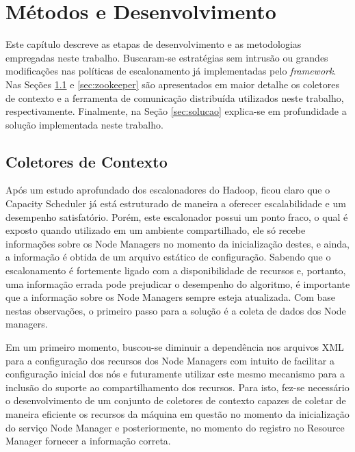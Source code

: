 \chapter{Métodos e Desenvolvimento}
\label{cap:desen}
Este capítulo descreve as etapas de desenvolvimento e as metodologias empregadas neste trabalho. Buscaram-se estratégias sem intrusão ou grandes modificações nas políticas de escalonamento já implementadas pelo \textit{framework}. Nas Seções \ref{sec:collector} e \ref{sec:zookeeper} são apresentados em maior detalhe os coletores de contexto e a ferramenta de comunicação distribuída utilizados neste trabalho, respectivamente. Finalmente, na Seção \ref{sec:solucao} explica-se em profundidade a solução implementada neste trabalho.

\section{Coletores de Contexto}
\label{sec:collector}


Após um estudo aprofundado dos escalonadores do Hadoop, ficou claro que o Capacity Scheduler já está estruturado de maneira a oferecer escalabilidade e um desempenho satisfatório. Porém, este escalonador possui um ponto fraco, o qual é exposto quando utilizado em um ambiente compartilhado, ele só recebe informações sobre os Node Managers no momento da inicialização destes, e ainda, a informação é obtida de um arquivo estático de configuração. Sabendo que o escalonamento é fortemente ligado com a disponibilidade de recursos e, portanto, uma informação errada pode prejudicar o desempenho do algoritmo, é importante que a informação sobre os Node Managers sempre esteja atualizada. Com base nestas observações, o primeiro passo para a solução é a coleta de dados dos Node managers.

Em um primeiro momento, buscou-se diminuir a dependência nos arquivos XML para a configuração dos recursos dos Node Managers com intuito de facilitar a configuração inicial dos nós e futuramente utilizar este mesmo mecanismo para a inclusão do suporte ao compartilhamento dos recursos. Para isto, fez-se necessário o desenvolvimento de um conjunto de coletores de contexto capazes de coletar de maneira eficiente os recursos da máquina em questão no momento da inicialização do serviço Node Manager e posteriormente, no momento do registro no Resource Manager fornecer a informação correta.

